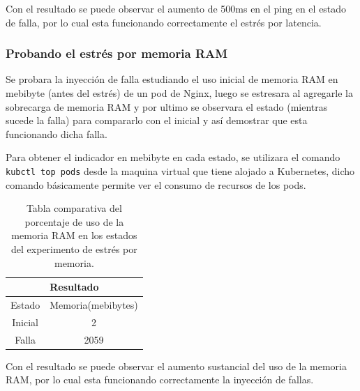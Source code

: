 \vspace{\baselineskip}
\par Con el resultado se puede observar el aumento de 500ms en el ping en el estado de falla, por lo cual esta funcionando correctamente el estrés por latencia.\\

\subsubsection{Probando el estrés por memoria RAM}


\par Se probara la inyección de falla estudiando el uso inicial de memoria RAM en mebibyte (antes del estrés) de un pod de Nginx, luego se estresara al agregarle la sobrecarga de memoria RAM y por ultimo se observara el estado (mientras sucede la falla) para compararlo con el inicial y así demostrar que esta funcionando dicha falla.\\

\par Para obtener el indicador en mebibyte en cada estado, se utilizara el comando \\ \verb|kubctl top pods| desde la maquina virtual que tiene alojado a Kubernetes, dicho comando básicamente permite ver el consumo de recursos de los pods.\\
\begin{table}[ht!]
\begin{center}
\begin{tabular}{ |c|c| } 
 \hline
 \multicolumn{2}{|c|}{Resultado} \\
 \hline
 \hline
 Estado & Memoria(mebibytes)\\
 \hline
 Inicial & 2\\
 Falla & 2059\\
 \hline
\end{tabular}
\end{center}
\caption{Tabla comparativa del porcentaje de uso de la memoria RAM en los estados del experimento de estrés por memoria.}
\label{tab:tabla43}
\end{table}

\vspace{\baselineskip}
\par Con el resultado se puede observar el aumento sustancial del uso de la memoria RAM, por lo cual esta funcionando correctamente la inyección de fallas.\\

